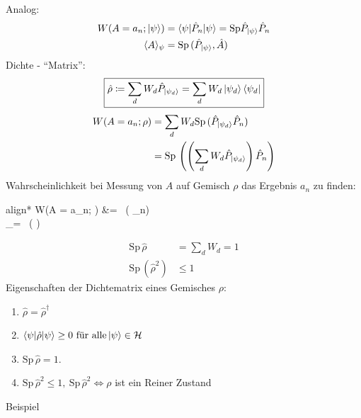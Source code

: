 	Analog:
		\begin{align*}
			W(A = a_n; \ket{\psi}) &= \braket{\psi | \hat{P}_n | \psi} = 
			\mathrm{Sp } \hat{P}_{\ket{\psi}} \hat{P}_n \\
			\langle {A} \rangle_\psi &= \mathrm{Sp} \, (\hat{P}_{\ket{\psi}}, \hat{A}) 
		\end{align*}
	Dichte - ``Matrix'':
		\begin{align*}
			\boxed{
					\hat{\rho} \coloneqq \sum_d W_d \hat{P}_{\ket{\psi_d}} = 
					\sum_d W_d \ket{\psi_d} \bra{\psi_d}
				}
		\end{align*}
		\begin{align*}
			W(A = a_n; \rho) &= \sum_d W_d \mathrm{Sp}\, (\hat{P}_{\ket{\psi_d}} \hat{P}_n) \\
			&= \mathrm{Sp}\, \left(
				\left(
					\sum_d W_d \hat{P}_{\ket{\psi_d}} 
				\right) \hat{P}_n
			\right)
		\end{align*}
	Wahrscheinlichkeit bei Messung von $A$ auf Gemisch $\rho$ das Ergebnis $a_n$ zu finden:
		\begin{empheq}[box = \boxed]{align*}
			W(A = a_n; \rho) &=  \, (\hat{\rho} _n)\\
			_\rho = \, (\hat{\rho} \cdot {}) 
		\end{empheq}	
		\begin{align*}
			\mathrm{Sp}\, \hat{\rho} &= \sum_d W_d = 1 \\
			\mathrm{Sp}\, (\hat{\rho}^2) &\leq 1
		\end{align*}
	Eigenschaften der Dichtematrix eines Gemisches $\rho$:
		\begin{enumerate}[1.]
			\item $\hat{\rho} = \hat{\rho}^\dagger$
			\item $\braket{\psi | \hat{\rho} | \psi} \geq 0 ~\text{für alle} \ket{\psi} \in \mathcal{H}$ 
			\item $\mathrm{Sp}\, \hat{\rho} =1$.
			\item $\mathrm{Sp}\, \hat{\rho}^2 \leq 1, ~
			\mathrm{Sp}\,\hat{\rho}^2 \Leftrightarrow \rho$ ist ein Reiner Zustand
		\end{enumerate}
	Beispiel
